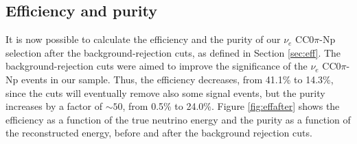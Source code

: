 \subsection{Efficiency and purity}
It is now possible to calculate the efficiency and the purity of our $\nu_{e}$ CC0$\pi$-Np selection after the background-rejection cuts, as defined in Section \ref{sec:eff}. The background-rejection cuts were aimed to improve the significance of the $\nu_{e}$ CC0$\pi$-Np events in our sample. Thus, the efficiency decreases, from 41.1\% to 14.3\%, since the cuts will eventually remove also some signal events, but the purity increases by a factor of $\sim50$, from 0.5\% to 24.0\%. Figure \ref{fig:effafter} shows the efficiency as a function of the true neutrino energy and the purity as a function of the reconstructed energy, before and after the background rejection cuts. 

